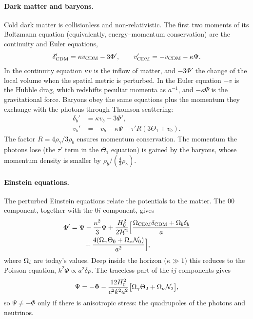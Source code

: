 \paragraph*{Dark matter and baryons.} Cold dark matter is collisionless and non-relativistic. The first two moments of
its Boltzmann equation (equivalently, energy--momentum conservation) are the continuity and Euler equations,
\begin{equation}
\delta_{\rm CDM}' = \kappa v_{\rm CDM} - 3\Phi', \qquad v_{\rm CDM}' = -v_{\rm CDM} - \kappa\Psi.
\end{equation}
In the continuity equation $\kappa v$ is the inflow of matter, and $-3\Phi'$ the change of the local volume when the
spatial metric is perturbed. In the Euler equation $-v$ is the Hubble drag, which redshifts peculiar momenta as
$a^{-1}$, and $-\kappa\Psi$ is the gravitational force. Baryons obey the same equations plus the momentum they
exchange with the photons through Thomson scattering:
\begin{align}
\delta_b' &= \kappa v_b - 3\Phi', \\
v_b' &= -v_b - \kappa\Psi + \tau'R(3\Theta_1+v_b).
\end{align}
The factor $R=4\rho_\gamma/3\rho_b$ ensures momentum conservation. The momentum the photons lose (the $\tau'$ term in
the $\Theta_1$ equation) is gained by the baryons, whose momentum density is smaller by $\rho_b/(\tfrac43\rho_\gamma)$.

\paragraph*{Einstein equations.} The perturbed Einstein equations relate the potentials to the matter. The $00$
component, together with the $0i$ component, gives
\begin{align}
\Phi' &= \Psi - \frac{\kappa^2}{3}\Phi + \frac{H_0^2}{2\mathcal{H}^2}\Big[\frac{\Omega_{\rm CDM}\delta_{\rm CDM}+\Omega_b\delta_b}{a} \nonumber\\
      &\qquad + \frac{4(\Omega_\gamma\Theta_0+\Omega_\nu\mathcal{N}_0)}{a^2}\Big], \label{eq:einstein1}
\end{align}
where $\Omega_i$ are today's values. Deep inside the horizon ($\kappa\gg1$) this reduces to the Poisson equation,
$k^2\Phi\propto a^2\delta\rho$. The traceless part of the $ij$ components gives
\begin{equation}
\Psi = -\Phi - \frac{12H_0^2}{c^2k^2a^2}\big[\Omega_\gamma\Theta_2+\Omega_\nu\mathcal{N}_2\big],
\label{eq:einstein2}
\end{equation}
so $\Psi\neq-\Phi$ only if there is anisotropic stress: the quadrupoles of the photons and neutrinos.

